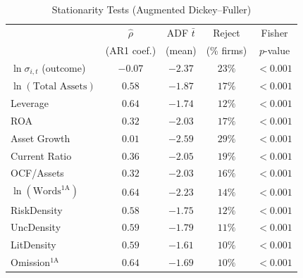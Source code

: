 \begin{table}[htbp]
\centering
\caption{Stationarity Tests (Augmented Dickey--Fuller)}
\label{tab:stationarity}
\footnotesize
\setlength{\tabcolsep}{8pt}
\begin{tabular}{l c c c c}
\toprule
 & $\hat\rho$ & ADF $\bar t$ & Reject & Fisher \\
 & {\scriptsize (AR1 coef.)} & {\scriptsize (mean)} & {\scriptsize (\% firms)} & {\scriptsize $p$-value} \\
\midrule
$\ln \sigma_{i,t}$ (outcome) & $-0.07$ & $-2.37$ & $23\%$ & $<0.001$ \\
$\ln(\text{Total Assets})$ & $0.58$ & $-1.87$ & $17\%$ & $<0.001$ \\
Leverage & $0.64$ & $-1.74$ & $12\%$ & $<0.001$ \\
ROA & $0.32$ & $-2.03$ & $17\%$ & $<0.001$ \\
Asset Growth & $0.01$ & $-2.59$ & $29\%$ & $<0.001$ \\
Current Ratio & $0.36$ & $-2.05$ & $19\%$ & $<0.001$ \\
OCF/Assets & $0.32$ & $-2.03$ & $16\%$ & $<0.001$ \\
$\ln(\text{Words}^{\text{1A}})$ & $0.64$ & $-2.23$ & $14\%$ & $<0.001$ \\
RiskDensity & $0.58$ & $-1.75$ & $12\%$ & $<0.001$ \\
UncDensity & $0.59$ & $-1.79$ & $11\%$ & $<0.001$ \\
LitDensity & $0.59$ & $-1.61$ & $10\%$ & $<0.001$ \\
Omission$^{\text{1A}}$ & $0.64$ & $-1.69$ & $10\%$ & $<0.001$ \\
\bottomrule
\end{tabular}
\par\smallskip
\noindent\footnotesize 

\end{table}
